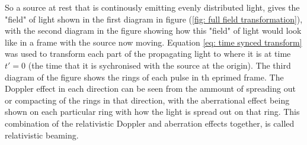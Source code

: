 So a source at rest that is continously emitting evenly distributed light, gives the "field" of light shown in the first diagram in figure (\ref{fig: full field transformation}), with the second diagram in the figure showing how this "field" of light would look like in a frame with the source now moving.
Equation \eqref{eq: time synced transform} was used to transform each part of the propagating light to where it is at time $t'=0$ (the time that it is sychronised with the source at the origin).
The third diagram of the figure shows the rings of each pulse in th eprimed frame.
The Doppler effect in each direction can be seen from the ammount of spreading out or compacting of the rings in that direction, with the aberrational effect being shown on each particular ring with how the light is spread out on that ring.
This combination of the relativistic Doppler and aberration effects together, is called relativistic beaming.


